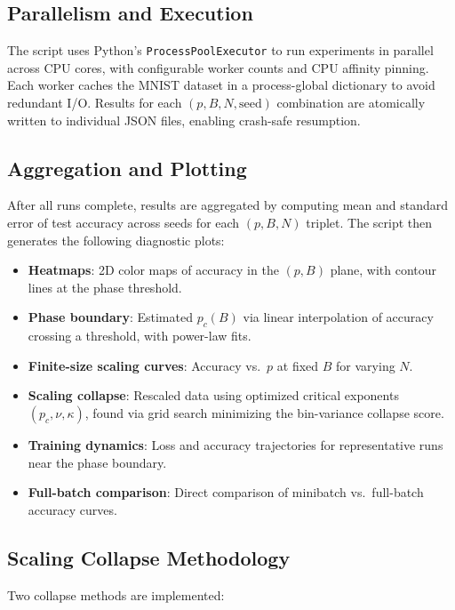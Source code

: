 \documentclass[11pt,a4paper]{article}
\begin{document}
\subsection{Parallelism and Execution}

The script uses Python's \texttt{ProcessPoolExecutor} to run experiments in parallel across CPU cores, with configurable worker counts and CPU affinity pinning. Each worker caches the MNIST dataset in a process-global dictionary to avoid redundant I/O. Results for each $(p, B, N, \text{seed})$ combination are atomically written to individual JSON files, enabling crash-safe resumption.

\subsection{Aggregation and Plotting}

After all runs complete, results are aggregated by computing mean and standard error of test accuracy across seeds for each $(p, B, N)$ triplet. The script then generates the following diagnostic plots:
\begin{itemize}
  \item \textbf{Heatmaps}: 2D color maps of accuracy in the $(p, B)$ plane, with contour lines at the phase threshold.
  \item \textbf{Phase boundary}: Estimated $p_c(B)$ via linear interpolation of accuracy crossing a threshold, with power-law fits.
  \item \textbf{Finite-size scaling curves}: Accuracy vs.\ $p$ at fixed $B$ for varying $N$.
  \item \textbf{Scaling collapse}: Rescaled data using optimized critical exponents $(p_c, \nu, \kappa)$, found via grid search minimizing the bin-variance collapse score.
  \item \textbf{Training dynamics}: Loss and accuracy trajectories for representative runs near the phase boundary.
  \item \textbf{Full-batch comparison}: Direct comparison of minibatch vs.\ full-batch accuracy curves.
\end{itemize}

\subsection{Scaling Collapse Methodology}

Two collapse methods are implemented:
\end{document}
